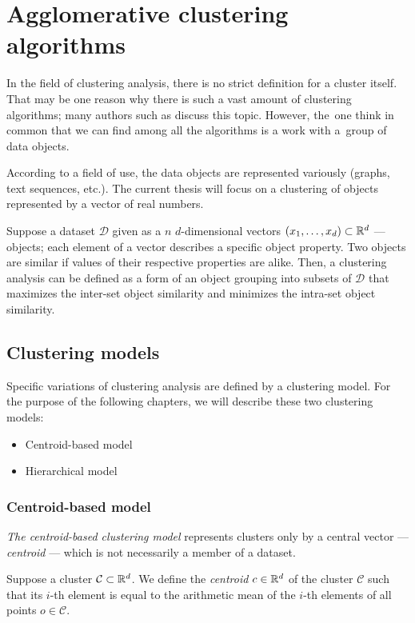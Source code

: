 \chapter{Agglomerative clustering algorithms}

In the field of clustering analysis, there is no strict definition for a cluster itself. That may be one reason why there is such a vast amount of clustering algorithms; many authors such as \citet{estivill2002so} discuss this topic.  However, the~one think in common that we can find among all the algorithms is a work with a~group of data objects.


According to a field of use, the data objects are represented variously (graphs, text sequences, etc.). The current thesis will focus on a clustering of objects represented by a vector of real numbers.

Suppose a dataset $\mathcal{D}$ given as a $n$ $d$-dimensional vectors $(x_1,\dots,x_d) \subset \mathbb{R}^d$  --- objects; each element of a vector describes a specific object property. Two objects are similar if values of their respective properties are alike. Then, a clustering analysis can be defined as a form of an object grouping into subsets of $\mathcal{D}$ that maximizes the inter-set object similarity and minimizes the intra-set object similarity.

\section{Clustering models}

Specific variations of clustering analysis are defined by a clustering model. For the purpose of the following chapters, we will describe these two clustering models:
\begin{itemize}
	\item Centroid-based model
	\item Hierarchical model
\end{itemize}


\subsection{Centroid-based model}

\emph{The centroid-based clustering model} represents clusters only by a central vector --- \emph{centroid} --- which is not necessarily a member of a dataset.

\begin{defn}[Centroid]
	Suppose a cluster $\mathcal{C} \subset \mathbb{R}^d$. We define the \emph{centroid} $c \in \mathbb{R}^d$ of the cluster $\mathcal{C}$ such that its $i$-th element is equal to the arithmetic mean of the $i$-th elements of all points $o \in \mathcal{C}$. 
	\label{def01:centr}
\end{defn}

